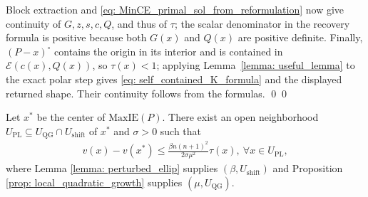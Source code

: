 \documentclass[smallextended]{svjour3}
\let\springerproof\proof
\let\endspringerproof\endproof
\renewenvironment{proof}{\springerproof}{%
  \ifhmode\qed\else\leavevmode\qed\fi\endspringerproof}
\newcommand{\E}{\mathcal{E}}
\newcommand{\MaxIE}{\mathrm{MaxIE}}
\begin{document}
\begin{proof}
Block extraction and \eqref{eq: MinCE_primal_sol_from_reformulation} now give
continuity of $G,z,s,c,Q$, and thus of $\tau$; the scalar denominator in the
recovery formula is positive because both $G(x)$ and $Q(x)$ are positive
definite. Finally, $(P-x)^\circ$ contains the origin in its interior and is
contained in $\E(c(x),Q(x))$, so $\tau(x)<1$; applying
Lemma~\ref{lemma: useful_lemma} to the exact polar step gives
\eqref{eq: self_contained_K_formula} and the displayed returned shape.
Their continuity follows from the formulas.
\end{proof}

\begin{proposition}\label{prop: local_PL}
    Let $x^*$ be the center of $\MaxIE(P)$. There exist an open neighborhood $U_{\mathrm{PL}}\subseteq U_{\mathrm{QG}} \cap U_{\mathrm{shift}}$ of $x^*$ and $\sigma > 0$ such that
    \begin{align*}
        v(x) - v(x^*) \leq  \frac{\beta n (n+1)^2}{2\sigma \mu^2}\tau(x),~\forall x\in U_{\mathrm{PL}},
    \end{align*}
    where Lemma \ref{lemma: perturbed_ellip} supplies
    $(\beta,U_{\mathrm{shift}})$ and Proposition
    \ref{prop: local_quadratic_growth} supplies $(\mu,U_{\mathrm{QG}})$.
\end{proposition}
\end{document}
